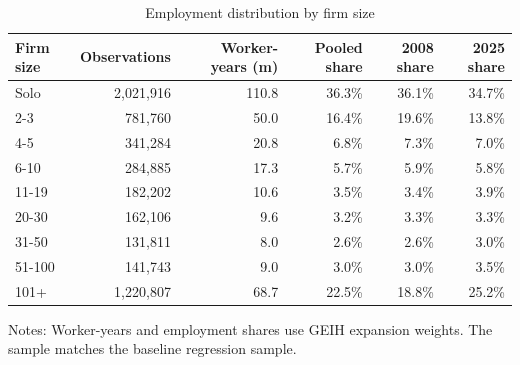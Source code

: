 \begin{table}[htbp]
  \centering
  \caption{Employment distribution by firm size}
  \label{tab:descriptive-employment-size}
  \small
  \begin{tabular}{lrrrrr}
    \toprule
    Firm size & Observations & Worker-years (m) & Pooled share & 2008 share & 2025 share \\
    \midrule
    Solo & 2,021,916 & 110.8 & 36.3\% & 36.1\% & 34.7\% \\
    2-3 & 781,760 & 50.0 & 16.4\% & 19.6\% & 13.8\% \\
    4-5 & 341,284 & 20.8 & 6.8\% & 7.3\% & 7.0\% \\
    6-10 & 284,885 & 17.3 & 5.7\% & 5.9\% & 5.8\% \\
    11-19 & 182,202 & 10.6 & 3.5\% & 3.4\% & 3.9\% \\
    20-30 & 162,106 & 9.6 & 3.2\% & 3.3\% & 3.3\% \\
    31-50 & 131,811 & 8.0 & 2.6\% & 2.6\% & 3.0\% \\
    51-100 & 141,743 & 9.0 & 3.0\% & 3.0\% & 3.5\% \\
    101+ & 1,220,807 & 68.7 & 22.5\% & 18.8\% & 25.2\% \\
    \bottomrule
  \end{tabular}
  \vspace{0.3em}
  \begin{minipage}{0.95\textwidth}
  \footnotesize
  Notes: Worker-years and employment shares use GEIH expansion weights. The sample matches the baseline regression sample.
  \end{minipage}
\end{table}
